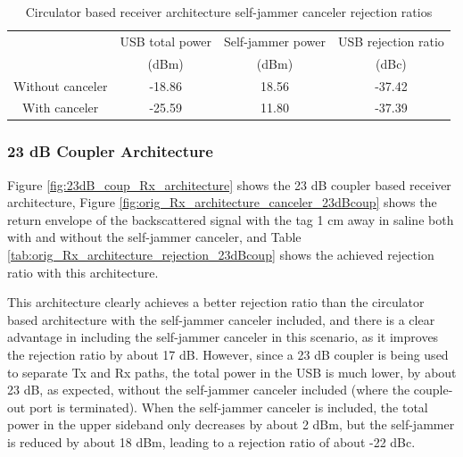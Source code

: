 \documentclass[12pt,onecolumn,titlepage]{article}
\begin{document}
\begin{table}[h!]
\centering
	\caption{Circulator based receiver architecture self-jammer canceler rejection ratios}
	\begin{tabular}{| c | c | c || c |}
	\hline
	 & USB total power & Self-jammer power  & USB rejection ratio  \\
	 & (dBm) & (dBm) & (dBc) \\ \hline
	 Without canceler & -18.86 & 18.56 & -37.42 \\ \hline
	 With canceler & -25.59 & 11.80 & -37.39 \\ \hline
	\end{tabular}
\label{tab:alt_Rx_architecture_rejection}
\end{table}


\subsubsection{23 dB Coupler Architecture}

Figure \ref{fig:23dB_coup_Rx_architecture} shows the 23 dB coupler based receiver architecture, Figure \ref{fig:orig_Rx_architecture_canceler_23dBcoup} shows the return envelope of the backscattered signal with the tag 1 cm away in saline both with and without the self-jammer canceler, and Table \ref{tab:orig_Rx_architecture_rejection_23dBcoup} shows the achieved rejection ratio with this architecture. 

This architecture clearly achieves a better rejection ratio than the circulator based architecture with the self-jammer canceler included, and there is a clear advantage in including the self-jammer canceler in this scenario, as it improves the rejection ratio by about 17 dB. However, since a 23 dB coupler is being used to separate Tx and Rx paths, the total power in the USB is much lower, by about 23 dB, as expected, without the self-jammer canceler included (where the couple-out port is terminated). When the self-jammer canceler is included, the total power in the upper sideband only decreases by about 2 dBm, but the self-jammer is reduced by about 18 dBm, leading to a rejection ratio of about -22 dBc.
\end{document}

